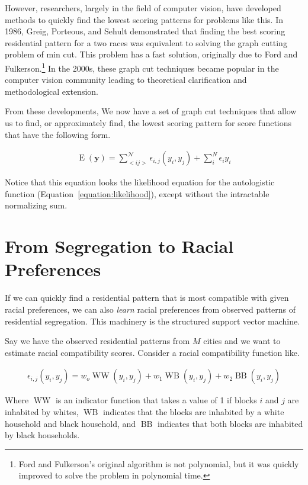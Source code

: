 However, researchers, largely in the field of computer vision, have
developed methods to quickly find the lowest scoring patterns for
problems like this. In 1986, Greig, Porteous, and Sehult demonstrated
that finding the best scoring residential pattern for a two races was
equivalent to solving the graph cutting problem of min
cut.\cite{greig_exact_1989} This problem has a fast solution,
originally due to Ford and Fulkerson.\footnote{Ford and Fulkerson's
  original algorithm is not polynomial, but it was quickly improved to
  solve the problem in polynomial time.\cite{ford_maximal_1956}} In
the 2000s, these graph cut techniques became popular in the computer
vision community leading to theoretical clarification and
methodological extension.\cite{kolmogorov_what_2004}

From these developments, We now have a set of graph cut techniques
that allow us to find, or approximately find, the lowest scoring
pattern for score functions that have the following form.

\begin{align}
\operatorname{E}(\mathbf{y}) = \sum_{<i
  j>}^{\mathcal{N}}\epsilon_{i,j}(y_i,y_j) + \sum_i^N\epsilon_i{y_i}
\end{align}

Notice that this equation looks the likelihood equation for the
autologistic function (Equation~\ref{equation:likelihood}), except
without the intractable normalizing sum.

\section*{From Segregation to Racial Preferences}
If we can quickly find a residential pattern that is most compatible
with given racial preferences, we can also \emph{learn} racial
preferences from observed patterns of residential segregation. This
machinery is the structured support vector machine. 

Say we have the observed residential patterns from $M$ cities and we
want to estimate racial compatibility scores. Consider a racial
compatibility function like.

\begin{align}
  \epsilon_{i,j}(y_i,y_j) = w_o\operatorname{WW}(y_{i}, y_{j}) +
  w_1\operatorname{WB}(y_{i}, y_{j}) + w_2\operatorname{BB}(y_{i}, y_{j})
\end{align} 

Where $\operatorname{WW}$ is an indicator function that takes a value
of 1 if blocks $i$ and $j$ are inhabited by whites,
$\operatorname{WB}$ indicates that the blocks are inhabited by a white
household and black household, and $\operatorname{BB}$ indicates that
both blocks are inhabited by black households.

